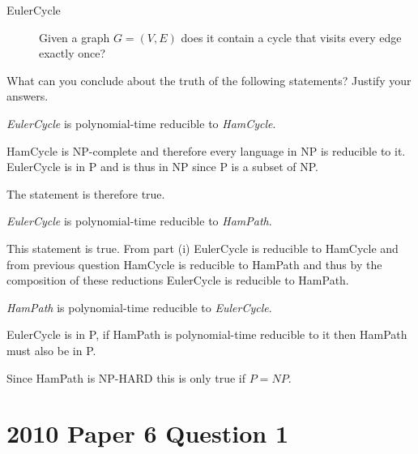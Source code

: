 \documentclass{supervision}
\begin{document}
\begin{questions}
\begin{parts}
          \begin{description}
            \item[EulerCycle] Given a graph $G = (V, E)$ does it contain a
              cycle that visits every edge exactly once?
          \end{description}

          What can you conclude about the truth of the following statements?
          Justify your answers.

          \begin{subparts}
            \subpart[3] \emph{EulerCycle} is polynomial-time reducible to
              \emph{HamCycle}.
              \begin{solution}
                HamCycle is NP-complete and therefore every language in NP is
                reducible to it. EulerCycle is in P and is thus in NP since P
                is a subset of NP.

                The statement is therefore true.
              \end{solution}

            \subpart[3] \emph{EulerCycle} is polynomial-time reducible to
              \emph{HamPath}.
              \begin{solution}
                This statement is true. From part (i) EulerCycle is reducible to
                HamCycle and from previous question HamCycle is reducible to
                HamPath and thus by the composition of these reductions
                EulerCycle is reducible to HamPath.
              \end{solution}

            \subpart[3] \emph{HamPath} is polynomial-time reducible to
              \emph{EulerCycle}.
              \begin{solution}
                EulerCycle is in P, if HamPath is polynomial-time reducible to
                it then HamPath must also be in P.

                Since HamPath is NP-HARD this is only true if $P = NP$.
              \end{solution}

          \end{subparts}
      \end{parts}

    \section*{2010 Paper 6 Question 1}
    \question
      \begin{parts}

\end{parts}
\end{questions}
\end{document}
